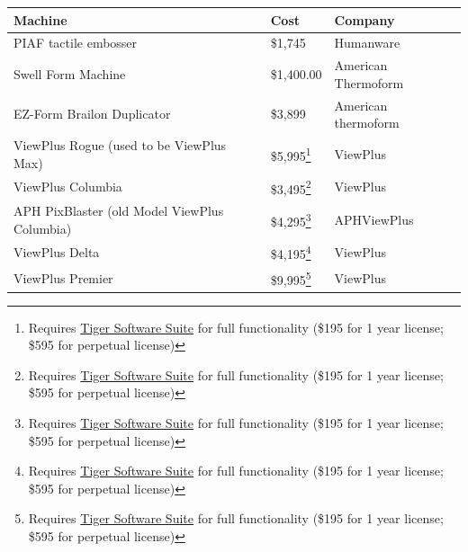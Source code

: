 \documentclass[14pt, letterpaper,twoside]{extreport}
\begin{document}
\begin{longtable}[]{@{}
	>{\raggedright\arraybackslash}p{}
	>{\raggedright\arraybackslash}p{}
	>{\raggedright\arraybackslash}p{}@{}
	}
	\textbf{Machine}                                    & \textbf{Cost}                                                                                                                                                                               & \textbf{Company}    \\
	\midrule\noalign{}
	\endhead
	\bottomrule\noalign{}
	\endlastfoot
	PIAF tactile embosser                               & \$1,745                                                                                                                                                                                     & Humanware           \\[1.0em]
	Swell Form Machine                                  & \$1,400.00                                                                                                                                                                                  & American Thermoform \\[1.0em]
	EZ-Form Brailon Duplicator                          & \$3,899                                                                                                                                                                                     & American thermoform \\[1.0em]
	ViewPlus Rogue \break (used to be ViewPlus Max)     & \$5,995\footnote{Requires \href{https://viewplus.com/product/tiger-software-suite8/}{Tiger Software Suite} for full functionality (\$195 for 1 year license; \$595 for perpetual license)}  & ViewPlus            \\[1.0em]
	ViewPlus Columbia                                   & \$3,495\footnote{Requires \href{https://viewplus.com/product/tiger-software-suite8/}{Tiger Software Suite} for full functionality (\$195 for 1 year license; \$595 for perpetual license)}  & ViewPlus            \\[1.0em]
	APH PixBlaster \break (old Model ViewPlus Columbia) & \$4,295\footnote{Requires \href{https://viewplus.com/product/tiger-software-suite8/}{Tiger Software Suite} for full functionality (\$195 for 1 year license; \$595 for perpetual license)}  & APH\break ViewPlus  \\[1.0em]
	ViewPlus Delta                                      & \$4,195\footnote{Requires \href{https://viewplus.com/product/tiger-software-suite8/}{Tiger Software Suite} for full functionality (\$195 for 1 year license; \$595 for perpetual license)}  & ViewPlus            \\[1.0em]
	ViewPlus Premier                                    & \$9,995\footnote{Requires \href{https://viewplus.com/product/tiger-software-suite8/}{Tiger Software Suite} for full functionality (\$195 for 1 year license; \$595 for perpetual license)}  & ViewPlus            \\[1.0em]

\end{longtable}
\end{document}
